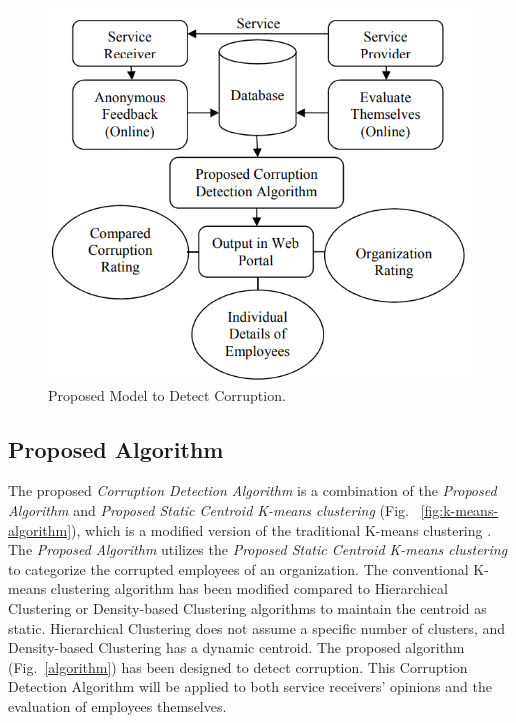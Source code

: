 \documentclass[conference]{IEEEtran}
\begin{document}
\begin{figure}[h]
  \centering
  \includegraphics[width=0.5\linewidth]{corruption.png}
  \caption{Proposed Model to Detect Corruption.}
  \label{fig:model}
\end{figure}

\subsection{Proposed Algorithm}
The proposed \emph{Corruption Detection Algorithm} is a combination of the \emph{Proposed Algorithm} and \emph{Proposed Static Centroid K-means clustering} (Fig. ~\ref{fig:k-means-algorithm}), which is a modified version of the traditional K-means clustering \cite{ref11}. The \emph{Proposed Algorithm} utilizes the \emph{Proposed Static Centroid K-means clustering} to categorize the corrupted employees of an organization. The conventional K-means clustering algorithm has been modified compared to Hierarchical Clustering or Density-based Clustering algorithms to maintain the centroid as static. Hierarchical Clustering does not assume a specific number of clusters, and Density-based Clustering has a dynamic centroid. The proposed algorithm (Fig.~\ref{algorithm}) has been designed to detect corruption. This Corruption Detection Algorithm will be applied to both service receivers' opinions and the evaluation of employees themselves.
\end{document}
